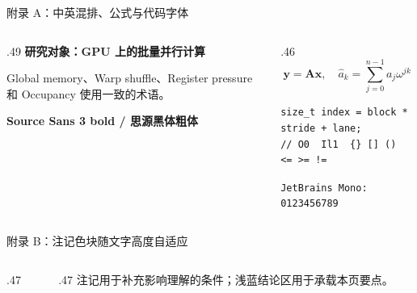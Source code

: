 \begin{frame}[fragile]{附录 A：中英混排、公式与代码字体}
\begin{columns}[T,onlytextwidth]
\begin{column}{.49\textwidth}
\textbf{研究对象：GPU 上的批量并行计算}\par\vspace{3mm}
Global memory、Warp shuffle、Register pressure 和 Occupancy 使用一致的术语。
\par\vspace{4mm}{\itshape Source Sans 3 italic}\par
{\bfseries Source Sans 3 bold / 思源黑体粗体}\par\vspace{4mm}
\end{column}
\begin{column}{.46\textwidth}
\[\mathbf y=\mathbf A\mathbf x,\quad \hat a_k=\sum_{j=0}^{n-1}a_j\omega^{jk}\]
\begin{lstlisting}
size_t index = block * stride + lane;
// O0  Il1  {} [] ()  <= >= !=
\end{lstlisting}
\smalltext\texttt{JetBrains Mono: 0123456789}\par\vspace{3mm}
\end{column}
\end{columns}
\end{frame}

\begin{frame}{附录 B：注记色块随文字高度自适应}
\begin{columns}[T,onlytextwidth]
\begin{column}{.47\textwidth}
\vspace{5mm}
\vspace{5mm}
\end{column}
\begin{column}{.47\textwidth}
\vspace{5mm}
注记用于补充影响理解的条件；浅蓝结论区用于承载本页要点。
\par\vspace{3mm}
\end{column}
\end{columns}
\end{frame}

